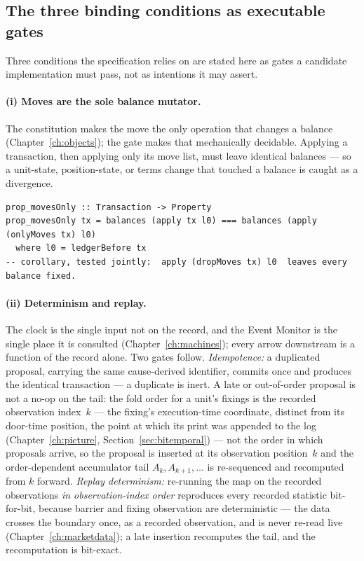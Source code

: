 \documentclass[11pt,a4paper]{article}
\begin{document}
\subsection{The three binding conditions as executable gates}

Three conditions the specification relies on are stated here as gates a candidate
implementation must pass, not as intentions it may assert.

\paragraph{(i) Moves are the sole balance mutator.}
The constitution makes the move the only operation that changes a balance
(Chapter~\ref{ch:objects}); the gate makes that mechanically decidable. Applying a
transaction, then applying only its move list, must leave identical balances --- so a
unit-state, position-state, or terms change that touched a balance is caught as a divergence.

\begin{lstlisting}
prop_movesOnly :: Transaction -> Property
prop_movesOnly tx = balances (apply tx l0) === balances (apply (onlyMoves tx) l0)
  where l0 = ledgerBefore tx
-- corollary, tested jointly:  apply (dropMoves tx) l0  leaves every balance fixed.
\end{lstlisting}

\paragraph{(ii) Determinism and replay.}
The clock is the single input not on the record, and the Event Monitor is the single place it
is consulted (Chapter~\ref{ch:machines}); every arrow downstream is a function of the record
alone. Two gates follow. \emph{Idempotence:} a duplicated proposal, carrying the same
cause-derived identifier, commits once and produces the identical transaction --- a
duplicate is inert. A late or out-of-order proposal is not a no-op on the tail: the
fold order for a unit's fixings is the recorded observation index~$k$ --- the fixing's
execution-time coordinate, distinct from its door-time position, the point at which its
print was appended to the log (Chapter~\ref{ch:picture}, Section~\ref{sec:bitemporal}) ---
not the order in which proposals arrive, so the proposal is inserted at its observation
position~$k$ and the order-dependent accumulator tail $A_{k},A_{k+1},\dots$ is re-sequenced
and recomputed from $k$ forward. \emph{Replay
determinism:} re-running the map on the recorded observations \emph{in observation-index
order} reproduces every recorded statistic bit-for-bit, because barrier and fixing
observation are deterministic --- the data crosses the boundary once, as a recorded
observation, and is never re-read live (Chapter~\ref{ch:marketdata}); a late insertion
recomputes the tail, and the recomputation is bit-exact.
\end{document}
